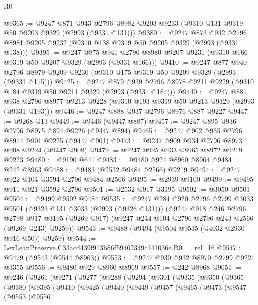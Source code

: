 \begin{lexlean}{R0}
\begin{coremodule}
@9365 := @9247
    @871
    @943
    @2796
    @8982
    @9203
    @9233
    (@9310 @131 @9319 @50 @9203 @9329 (@2993 (@9331 @131)))
@9380 := @9247
    @873
    @942
    @2796
    @8981
    @9205
    @9232
    (@9310 @138 @9319 @50 @9205 @9329 (@2993 (@9331 @138)))
@9395 := @9247
    @875
    @941
    @2796
    @8980
    @9207
    @9231
    (@9310 @166 @9319 @50 @9207 @9329 (@2993 (@9331 @166)))
@9410 := @9247
    @877
    @940
    @2796
    @8979
    @9209
    @9230
    (@9310 @175 @9319 @50 @9209 @9329 (@2993 (@9331 @175)))
@9425 := @9247
    @879
    @939
    @2796
    @8978
    @9211
    @9229
    (@9310 @184 @9319 @50 @9211 @9329 (@2993 (@9331 @184)))
@9440 := @9247
    @881
    @938
    @2796
    @8977
    @9213
    @9228
    (@9310 @193 @9319 @50 @9213 @9329 (@2993 (@9331 @193)))
@9446 := @9247 @888 @937 @2796 @8976 @887 @9227
@9447 := @9268 @13
@9449 := @9446 (@9447 @887)
@9457 := @9247 @895 @936 @2796 @8975 @894 @9226 (@9447 @894)
@9465 := @9247 @902 @935 @2796 @8974 @901 @9225 (@9447 @901)
@9473 := @9247 @909 @934 @2796 @8973 @908 @9224 (@9447 @908)
@9479 := @9247 @925 @933 @8965 @8972 @9219 @9223
@9480 := @9190 @641
@9483 := @9480 @924 @8960 @8964
@9484 := @242 @8963
@9488 := @9483 (@2532 @9484 @2566) @9219
@9494 := @9247 @922 @104 @3594 @2796 @9484 @2566
@9495 := @2939 @9100
@9499 := @9495 @911 @921 @3592 @2796
@9501 := @2532 @917 @3195
@9502 := @3050 @9501
@9504 := @9499 @9502 @9484
@9535 := @9247
    @284
    @920
    @2796
    @2799
    @3033
    @9501
    (@9323 @131 @3033 (@2993 (@9326 @131)))
    (@9247
      @918
      @246
      @2796
      @2798
      @917
      @3195
      (@9269 @917)
      (@9247 @244 @104 @2796 @2796 @243 @2566 (@9269 @243) @9259))
@9543 := @9488 (@9494 (@9504 @9535 (@4032 @2930 @916 @50)) @9259)
@9544 := LexLeanPreserve.C33acd439f913b86f59462349c141036e.R0.__rel_16
@9547 := @9479 (@9543 (@9544 @8963))
@9553 := @9247 @930 @932 @8970 @2799 @9221 @3355
@9556 := @9480 @929 @8960 @8969
@9557 := @242 @8968
@9651 := @9246
    (@9261
      (@9271
        (@9277
          (@9288
            (@9294
              (@9301
                (@9335
                  (@9350
                    (@9365
                      (@9380
                        (@9395
                          (@9410
                            (@9425
                              (@9440
                                (@9449
                                  (@9457
                                    (@9465
                                      (@9473
                                        (@9547
                                          (@9553
                                            (@9556

\end{coremodule}
\end{lexlean}
